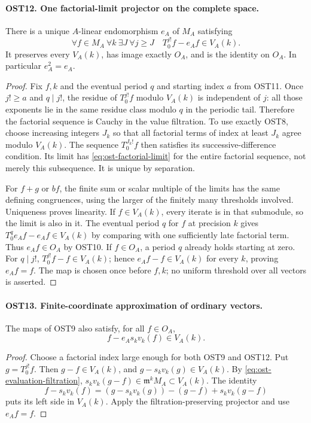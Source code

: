 \paragraph{OST12. One factorial-limit projector on the complete space.}
\label{claim:OST12}
There is a unique $A$-linear endomorphism $e_A$ of $M_A$
satisfying
\begin{equation}\label{eq:ost-factorial-limit}
 \forall f\in M_A\ \forall k\ \exists J\ \forall j\geq J
                 \quad T_0^{j!}f-e_Af\in V_A(k).
\end{equation}
It preserves every $V_A(k)$, has image exactly $O_A$, and
is the identity on $O_A$.  In particular $e_A^2=e_A$.
\begin{proof}
Fix $f,k$ and the eventual period $q$ and starting index $a$
from OST11.  Once $j!\geq a$ and $q\mid j!$, the residue
of $T_0^{j!}f$ modulo $V_A(k)$ is independent of $j$:
all those exponents lie in the same residue class modulo $q$
in the periodic tail.  Therefore the factorial sequence is
Cauchy in the value filtration.  To use exactly OST8, choose
increasing integers $J_k$ so that all factorial terms of
index at least $J_k$ agree modulo $V_A(k)$.  The sequence
$T_0^{J_k!}f$ then satisfies its successive-difference
condition.  Its limit has \eqref{eq:ost-factorial-limit}
for the entire factorial sequence, not merely this subsequence.
It is unique by separation.

For $f+g$ or $bf$, the finite sum or scalar multiple of the
limits has the same defining congruences, using the larger
of the finitely many thresholds involved.  Uniqueness proves
linearity.  If $f\in V_A(k)$, every iterate is in that
submodule, so the limit is also in it.  The eventual period
$q$ for $f$ at precision $k$ gives
$T_0^q e_Af-e_Af\in V_A(k)$ by comparing with one sufficiently
late factorial term.  Thus $e_Af\in O_A$ by OST10.
If $f\in O_A$, a period $q$ already holds starting at zero.
For $q\mid j!$, $T_0^{j!}f-f\in V_A(k)$; hence
$e_Af-f\in V_A(k)$ for every $k$, proving $e_Af=f$.
The map is chosen once before $f,k$; no uniform threshold
over all vectors is asserted.
\end{proof}

\paragraph{OST13. Finite-coordinate approximation of ordinary vectors.}
\label{claim:OST13}
The maps of OST9 also satisfy, for all $f\in O_A$,
\begin{equation}\label{eq:ost-ordinary-approx}
                   f-e_As_kv_k(f)\in V_A(k).
\end{equation}
\begin{proof}
Choose a factorial index large enough for both OST9 and OST12.
Put $g=T_0^{j!}f$.  Then $g-f\in V_A(k)$, and
$g-s_kv_k(g)\in V_A(k)$.  By
\eqref{eq:ost-evaluation-filtration},
$s_kv_k(g-f)\in\mathfrak m^kM_A\subset V_A(k)$.
The identity
\[
 f-s_kv_k(f)=(g-s_kv_k(g))-(g-f)+s_kv_k(g-f)
\]
puts its left side in $V_A(k)$.  Apply the filtration-preserving
projector and use $e_Af=f$.
\end{proof}

